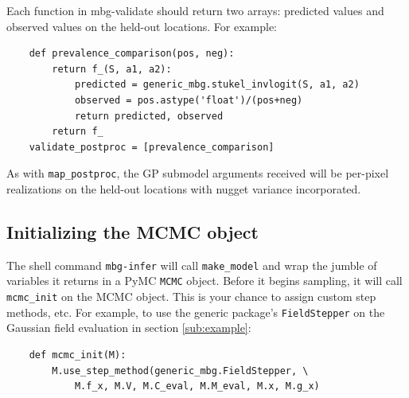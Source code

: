 Each function in mbg-validate should return two arrays: predicted values and observed values on the held-out locations. For example:
\begin{verbatim}
    def prevalence_comparison(pos, neg):
        return f_(S, a1, a2):
            predicted = generic_mbg.stukel_invlogit(S, a1, a2)
            observed = pos.astype('float')/(pos+neg)
            return predicted, observed
        return f_
    validate_postproc = [prevalence_comparison]
\end{verbatim}
As with \texttt{map\_postproc}, the GP submodel arguments received will be per-pixel realizations on the held-out locations with nugget variance incorporated.

\subsection{Initializing the MCMC object}
\label{sub:mcmc-init} 

The shell command \texttt{mbg-infer} will call \texttt{make\_model} and wrap the jumble of variables it returns in a PyMC \texttt{MCMC} object. Before it begins sampling, it will call \texttt{mcmc\_init} on the MCMC object. This is your chance to assign custom step methods, etc. For example, to use the generic package's \texttt{FieldStepper} on the Gaussian field evaluation in section \ref{sub:example}:
\begin{verbatim}
    def mcmc_init(M):
        M.use_step_method(generic_mbg.FieldStepper, \
            M.f_x, M.V, M.C_eval, M.M_eval, M.x, M.g_x)
\end{verbatim}

